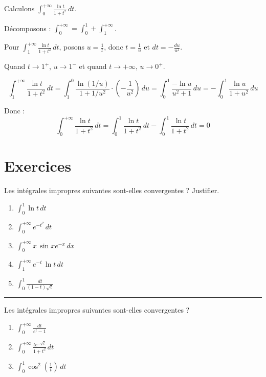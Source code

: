 \documentclass[../PolyS4.tex]{subfiles}
\begin{document}
\begin{Ex}
Calculons $\displaystyle\int_{0}^{+\infty} \frac{\ln t}{1 + t^2} \, dt$.

Décomposons : $\displaystyle\int_{0}^{+\infty} = \int_{0}^{1} + \int_{1}^{+\infty}$.

Pour $\displaystyle\int_{1}^{+\infty} \frac{\ln t}{1 + t^2} \, dt$, posons $u = \frac{1}{t}$, donc $t = \frac{1}{u}$ et $dt = -\frac{du}{u^2}$.

Quand $t \to 1^{+}$, $u \to 1^{-}$ et quand $t \to +\infty$, $u \to 0^{+}$.

$$\int_{1}^{+\infty} \frac{\ln t}{1 + t^2} \, dt = \int_{1}^{0} \frac{\ln(1/u)}{1 + 1/u^2} \cdot \left(-\frac{1}{u^2}\right) \, du = \int_{0}^{1} \frac{-\ln u}{u^2 + 1} \, du = -\int_{0}^{1} \frac{\ln u}{1 + u^2} \, du$$

Donc :
$$\int_{0}^{+\infty} \frac{\ln t}{1 + t^2} \, dt = \int_{0}^{1} \frac{\ln t}{1 + t^2} \, dt - \int_{0}^{1} \frac{\ln t}{1 + t^2} \, dt = 0$$
\end{Ex}

\newpage
\section{Exercices}


Les intégrales impropres suivantes sont-elles convergentes ? Justifier.

\begin{enumerate}
\item $\displaystyle\int_{0}^{1} \ln t \, dt$
\item $\displaystyle\int_{0}^{+\infty} e^{-t^{2}} \, dt$
\item $\displaystyle\int_{0}^{+\infty} x \, \sin x e^{-x} \, dx$
\item $\displaystyle\int_{1}^{+\infty} e^{-t}\, \ln t \, dt$
\item $\displaystyle\int_{0}^{1} \frac{dt}{(1-t) \sqrt{t}}$
\end{enumerate}

\vspace{1em}
\hrule
\vspace{1em}


Les intégrales impropres suivantes sont-elles convergentes ?

\begin{enumerate}
\item $\displaystyle\int_{0}^{+\infty} \frac{dt}{e^{t}-1}$
\item $\displaystyle\int_{0}^{+\infty} \frac{t e^{-\sqrt{t}}}{1+t^{2}} \, dt$
\item $\displaystyle\int_{0}^{1} \cos ^{2}\left(\frac{1}{t}\right) \, dt$
\end{enumerate}
\end{document}
